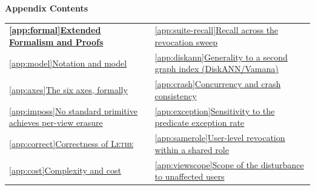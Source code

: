\documentclass[sigconf, nonacm, review]{acmart}
\begin{document}
\begin{strip}
\vspace*{0.3em}
\begin{center}{\large\bfseries Appendix Contents}\end{center}
\vspace{4pt}
\centering
\setlength{\tabcolsep}{10pt}
\renewcommand{\arraystretch}{1.2}
\begin{tabular}{@{}p{}p{}@{}}
\toprule
\hyperref[app:formal]{\textbf{\ref*{app:formal}}\hspace{0.5em}\textbf{Extended Formalism and Proofs}} & \hspace*{1.2em}\hyperref[app:suite-recall]{\ref*{app:suite-recall}\hspace{0.5em}Recall across the revocation sweep} \\
\hspace*{1.2em}\hyperref[app:model]{\ref*{app:model}\hspace{0.5em}Notation and model} & \hspace*{1.2em}\hyperref[app:diskann]{\ref*{app:diskann}\hspace{0.5em}Generality to a second graph index (DiskANN/Vamana)} \\
\hspace*{1.2em}\hyperref[app:axes]{\ref*{app:axes}\hspace{0.5em}The six axes, formally} & \hspace*{1.2em}\hyperref[app:crash]{\ref*{app:crash}\hspace{0.5em}Concurrency and crash consistency} \\
\hspace*{1.2em}\hyperref[app:imposs]{\ref*{app:imposs}\hspace{0.5em}No standard primitive achieves per-view erasure} & \hspace*{1.2em}\hyperref[app:exception]{\ref*{app:exception}\hspace{0.5em}Sensitivity to the predicate exception rate} \\
\hspace*{1.2em}\hyperref[app:correct]{\ref*{app:correct}\hspace{0.5em}Correctness of \textsc{Lethe}} & \hspace*{1.2em}\hyperref[app:samerole]{\ref*{app:samerole}\hspace{0.5em}User-level revocation within a shared role} \\
\hspace*{1.2em}\hyperref[app:cost]{\ref*{app:cost}\hspace{0.5em}Complexity and cost} & \hspace*{1.2em}\hyperref[app:viewscope]{\ref*{app:viewscope}\hspace{0.5em}Scope of the disturbance to unaffected users} \\

\end{tabular}
\end{strip}
\end{document}
